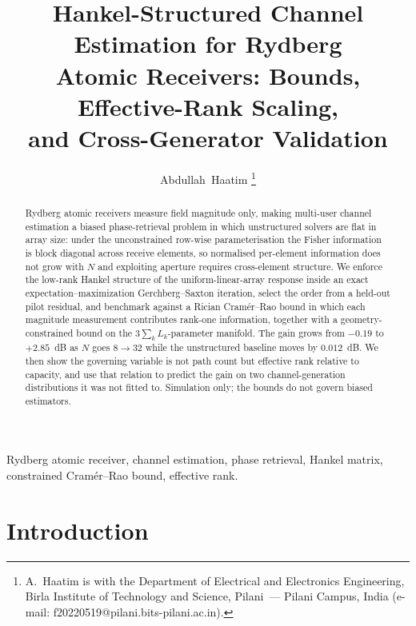 \documentclass[journal]{IEEEtran}
\begin{document}
\title{Hankel-Structured Channel Estimation for Rydberg\\
Atomic Receivers: Bounds, Effective-Rank Scaling,\\
and Cross-Generator Validation}

\author{Abdullah~Haatim%
\thanks{A.~Haatim is with the Department of Electrical and Electronics
Engineering, Birla Institute of Technology and Science, Pilani~--- Pilani
Campus, India (e-mail:
f20220519@pilani.bits-pilani.ac.in).}}

\maketitle

\begin{abstract}
Rydberg atomic receivers measure field magnitude only, making multi-user
channel estimation a biased phase-retrieval problem in which unstructured
solvers are flat in array size: under the unconstrained row-wise
parameterisation the Fisher information is block diagonal across receive
elements, so normalised per-element information does not grow with $N$ and
exploiting aperture requires cross-element structure. We
enforce the low-rank Hankel structure of the uniform-linear-array response
inside an exact expectation--maximization Gerchberg--Saxton iteration, select
the order from a held-out pilot residual, and benchmark against a Rician
Cram\'er--Rao bound in which each magnitude measurement contributes rank-one
information, together with a geometry-constrained bound on the
$3\sum_k L_k$-parameter manifold. The gain grows from $-0.19$ to $+2.85$~dB as
$N$ goes $8\to32$ while the unstructured baseline moves by $0.012$~dB. We then
show the governing variable is not path count but effective rank relative to
capacity, and use that relation to predict the gain on two channel-generation
distributions it was not fitted to. Simulation only; the bounds do not govern
biased estimators.
\end{abstract}

\begin{IEEEkeywords}
Rydberg atomic receiver, channel estimation, phase retrieval, Hankel matrix,
constrained Cram\'er--Rao bound, effective rank.
\end{IEEEkeywords}

\section{Introduction}
\end{document}
